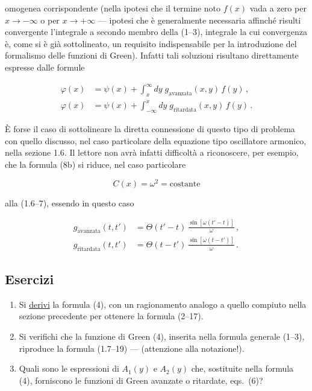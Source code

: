 \documentclass[11pt, a4paper]{book}
\numberwithin{equation}{section}
\newenvironment{esercizi}{\subsection*{Esercizi}\begin{enumerate}}{\end{enumerate}}
\begin{document}

omogenea corrispondente (nella ipotesi che il termine noto $f(x)$ vada a zero per $x \to -\infty$ o per $x \to +\infty$ --- ipotesi che è generalmente necessaria affinché risulti convergente l'integrale a secondo membro della (1--3), integrale la cui convergenza è, come si è già sottolineato, un requisito indispensabile per la introduzione del formalismo delle funzioni di Green). Infatti tali soluzioni risultano direttamente espresse dalle formule

\begin{align}
\tag{8a} \varphi(x) &= \psi(x) + \int_x^{\infty} dy\; g_{\text{avanzata}}(x,y)\,f(y)\,, \\
\tag{8b} \varphi(x) &= \psi(x) + \int_{-\infty}^{x} dy\; g_{\text{ritardata}}(x,y)\,f(y)\,.
\end{align}

È forse il caso di sottolineare la diretta connessione di questo tipo di problema con quello discusso, nel caso particolare della equazione tipo oscillatore armonico, nella sezione 1.6. Il lettore non avrà infatti difficoltà a riconoscere, per esempio, che la formula (8b) si riduce, nel caso particolare

\begin{equation}
\tag{9} C(x) = \omega^2 = \text{costante}
\end{equation}

alla (1.6--7), essendo in questo caso

\begin{align}
\tag{10a} g_{\text{avanzata}}(t,t') &= \Theta(t'-t)\,\frac{\sin[\omega(t'-t)]}{\omega}\,, \\
\tag{10b} g_{\text{ritardata}}(t,t') &= \Theta(t-t')\,\frac{\sin[\omega(t-t')]}{\omega}\,.
\end{align}

\begin{esercizi}
\item Si \underline{derivi} la formula (4), con un ragionamento analogo a quello compiuto nella sezione precedente per ottenere la formula (2--17).
\item Si verifichi che la funzione di Green (4), inserita nella formula generale (1--3), riproduce la formula (1.7--19) --- (attenzione alla notazione!).


\item Quali sono le espressioni di $A_1(y)$ e $A_2(y)$ che, sostituite nella formula (4), forniscono le funzioni di Green avanzate o ritardate, eqs.\ (6)?
\end{esercizi}
\end{document}
